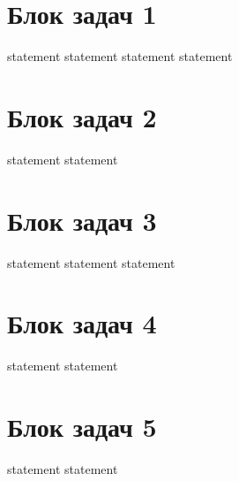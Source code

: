 \section{Блок задач 1}

{statement}
{statement}
{statement}
{statement}

\section{Блок задач 2}

{statement}
{statement}

\section{Блок задач 3}

{statement}
{statement}
{statement}

\section{Блок задач 4}

{statement}
{statement}

\section{Блок задач 5}

{statement}
{statement}
